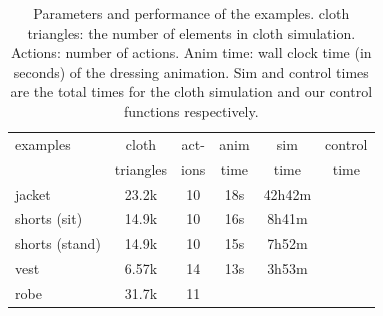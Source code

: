 \begin{table}
  \centering
  \begin{tabular}{|l|c|c|c|c|c|}
    \hline
    examples 		& cloth 	& act- 	& anim	& sim 		& control \\
                        & triangles & 	ions	& time 	& time 		& time \\
    \hline
    jacket 		& 23.2k  	& 10		& 18s 	& 42h42m	&     \\
    shorts (sit) 	& 14.9k 	& 10		& 16s 	&  8h41m 	&  \\
    shorts (stand)	& 14.9k 	& 10		& 15s	&  7h52m	&  \\
    vest 		& 6.57k		& 14		& 13s	&  3h53m	&    \\
    robe 		& 31.7k 	& 11		& 			& 			&    \\
    \hline
  \end{tabular}
  \caption{Parameters and performance of the examples. cloth triangles: the number of elements in cloth simulation. Actions: number of actions. Anim time: wall clock time (in seconds) of the dressing animation. Sim and control times are the total times for the cloth simulation and our control functions respectively.}
  \label{table:data}
\end{table}

